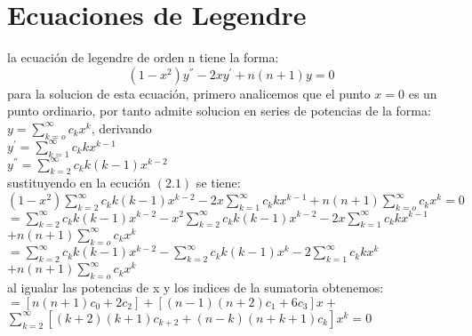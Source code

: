 \documentclass[12pt]{report}
\begin{document}
\chapter{Ecuaciones de Legendre}
la ecuaci\'on de legendre de orden n tiene la forma:\\
\begin{equation}
(1-x^{2})y^{''}-2xy^{'}+n(n+1)y=0
\end{equation}
para la solucion de esta ecuaci\'on, primero analicemos que  el punto $x=0$ es un punto ordinario, por tanto admite solucion en series de potencias de la forma:\\
\vspace{0.3cm}
$y=\sum_{k=o}^{\infty}c_{k}x^{k}$, derivando\\
\vspace{0.3cm}
$y^{'}=\sum_{k=1}^{\infty}c_{k}kx^{k-1}$\\
\vspace{0.3cm}
$y^{''}=\sum_{k=2}^{\infty}c_{k}k(k-1)x^{k-2}$\\
\vspace{0.3cm}
sustituyendo en la ecuci\'on $(2.1)$ se tiene:\\
\vspace{0.3cm}
$(1-x^{2})\sum_{k=2}^{\infty}c_{k}k(k-1)x^{k-2}-2x\sum_{k=1}^{\infty}c_{k}kx^{k-1}+n(n+1)\sum_{k=o}^{\infty}c_{k}x^{k}=0$\\
\vspace{0.3cm}
$=\sum_{k=2}^{\infty}c_{k}k(k-1)x^{k-2}-x^{2}\sum_{k=2}^{\infty}c_{k}k(k-1)x^{k-2}-2x\sum_{k=1}^{\infty}c_{k}kx^{k-1}$\\
\vspace{0.3cm}
$+n(n+1)\sum_{k=o}^{\infty}c_{k}x^{k}$\\
\vspace{0.3cm}
$=\sum_{k=2}^{\infty}c_{k}k(k-1)x^{k-2}-\sum_{k=2}^{\infty}c_{k}k(k-1)x^{k}-2\sum_{k=1}^{\infty}c_{k}kx^{k}$\\
\vspace{0.3cm}
$+n(n+1)\sum_{k=o}^{\infty}c_{k}x^{k}$\\
\vspace{0.3cm}
al igualar las potencias de x y los indices de la sumatoria obtenemos:\\
\vspace{0.3cm}
$=[n(n+1)c_{0}+2c_{2}]+[(n-1)(n+2)c_{1}+6c_{3}]x+$\\
\vspace{0.3cm}
$\sum_{k=2}^{\infty}[(k+2)(k+1)c_{k+2}+(n-k)(n+k+1)c_{k}]x^{k}=0$\\
\vspace{0.3cm}
\end{document}
